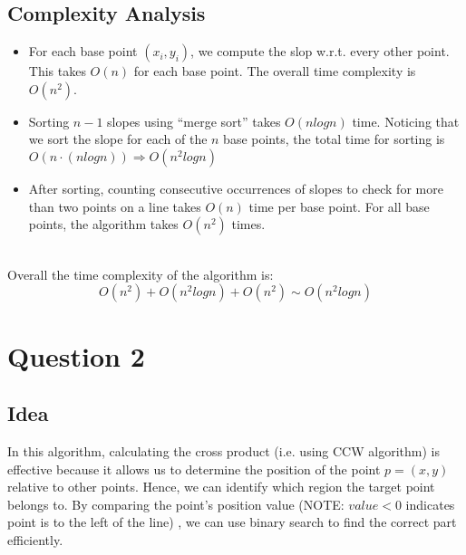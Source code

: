 \documentclass{article}
\begin{document}
\subsection*{Complexity Analysis}
\begin{itemize}
    \item For each base point $(x_i, y_i)$, we compute the slop w.r.t. every other point. This takes $O(n)$ for each base point. The overall time complexity is $O(n^2)$.
    \item Sorting $n - 1$ slopes using ``merge sort'' takes $O(nlogn)$ time. Noticing that we sort the slope for each of the $n$ base points, the total time for sorting is $O(n \cdot (nlogn)) \Rightarrow O(n^2 logn)$
    \item After sorting, counting consecutive occurrences of slopes to check for more than two points on a line takes $O(n)$ time per base point. For all base points, the algorithm takes $O(n^2)$ times.
\end{itemize}
\\
Overall the time complexity of the algorithm is:
\[ O(n^2) + O(n^2logn) + O(n^2) \sim O(n^2logn) \]

\section*{Question 2}

\subsection*{Idea}
In this algorithm, calculating the cross product (i.e. using CCW algorithm) is effective because it allows us to determine the position of the point $p = (x,y)$ relative to other points. Hence, we can identify which region the target point belongs to. By comparing the point's position value (NOTE: $value < 0$ indicates point is to the left of the line) , we can use binary search to find the correct part efficiently.
\end{document}
